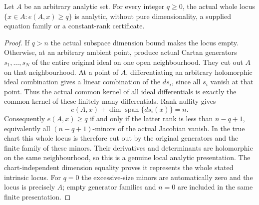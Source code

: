 \begin{lemma}
\label{hir:embedding-dimension-superlevels-analytic}
\leanok
{}
Let $A$ be an arbitrary analytic set. For every integer $q\ge0$,
the actual whole locus $\{x\in A:e(A,x)\ge q\}$ is analytic, without
pure dimensionality, a supplied equation family or a constant-rank
certificate.
\end{lemma}
\begin{proof}
If $q>n$ the actual subspace dimension bound makes the locus empty.
Otherwise, at an arbitrary ambient point, produce actual Cartan
generators $s_1,\ldots,s_N$ of the entire original ideal on one open
neighbourhood. They cut out $A$ on that neighbourhood. At a point of
$A$, differentiating an arbitrary holomorphic ideal combination gives
a linear combination of the $ds_i$, since all $s_i$ vanish at that
point. Thus the actual common kernel of all ideal differentials is
exactly the common kernel of these finitely many differentials.
Rank-nullity gives
\[
 e(A,x)+\dim\operatorname{span}\{ds_i(x)\}=n.
\]
Consequently $e(A,x)\ge q$ if and only if the latter rank is less than
$n-q+1$, equivalently all $(n-q+1)$-minors of the actual Jacobian
vanish. In the true chart this whole locus is therefore cut out by
the original generators and the finite family of these minors.
Their derivatives and determinants are holomorphic on the same
neighbourhood, so this is a genuine local analytic presentation.
The chart-independent dimension equality proves it represents the
whole stated intrinsic locus. For $q=0$ the excessive-size minors are
automatically zero and the locus is precisely $A$; empty generator
families and $n=0$ are included in the same finite presentation.
\end{proof}

